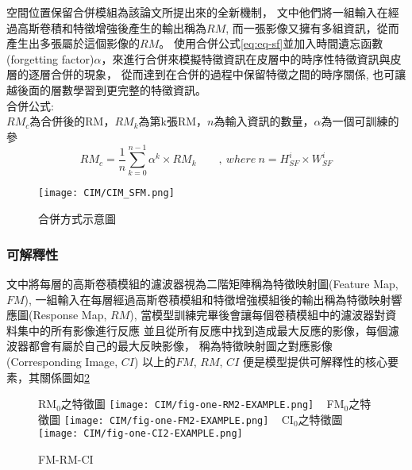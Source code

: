 \documentclass[class=NCU_thesis, crop=false]{standalone}
\begin{document}
空間位置保留合併模組為該論文所提出來的全新機制，
文中他們將一組輸入在經過高斯卷積和特徵增強後產生的輸出稱為$RM$,
而一張影像又擁有多組資訊，從而產生出多張屬於這個影像的$RM$。
使用合併公式\cref{eq:eq-sf}並加入時間遺忘函數(forgetting factor)$\alpha$，來進行合併來模擬特徵資訊在皮層中的時序性特徵資訊與皮層的逐層合併的現象，
從而達到在合併的過程中保留特徵之間的時序關係,
也可讓越後面的層數學習到更完整的特徵資訊。\\
合併公式:\\
$RM_{c}$為合併後的RM，$RM_{k}$為第k張RM，$n$為輸入資訊的數量，$\alpha$為一個可訓練的參
\begin{equation}
    \label{eq:eq-sf}
    RM_{c}=\frac{1}{n} \sum_{k = 0}^{n-1} \alpha^{k} \times RM_{k}  \qquad ,\ where\ n = \textit{H}^{i}_{SF} \times \textit{W}^{i}_{SF}
\end{equation}

\begin{figure}[H]
  \centering
  \texttt{[image: CIM/CIM\_SFM.png]}
  \caption{合併方式示意圖~\cite{YangCNNInterpretable}}
  \label{fig:CIM_SFM}
\end{figure}


\subsubsection{可解釋性}
文中將每層的高斯卷積模組的濾波器視為二階矩陣稱為特徵映射圖(Feature Map, $FM$),
一組輸入在每層經過高斯卷積模組和特徵增強模組後的輸出稱為特徵映射響應圖(Response Map, $RM$),
當模型訓練完畢後會讓每個卷積模組中的濾波器對資料集中的所有影像進行反應
並且從所有反應中找到造成最大反應的影像，每個濾波器都會有屬於自己的最大反映影像，
稱為特徵映射圖之對應影像(Corresponding Image, $CI$)
以上的$FM$, $RM$, $CI$ 便是模型提供可解釋性的核心要素，其關係圖如\cref{fig:one-FM2-RM2-CI2-EXAMPLE}

\begin{figure}[H]
    \centering
    \subcaptionbox
        {RM$_{0}$之特徵圖
        \label{fig:one-RM2-EXAMPLE}}
        {\texttt{[image: CIM/fig-one-RM2-EXAMPLE.png]}}
    ~
    \subcaptionbox
        {FM$_{0}$之特徵圖
        \label{fig:one-FM2-EXAMPLE}}
        {\texttt{[image: CIM/fig-one-FM2-EXAMPLE.png]}}
    ~
    \subcaptionbox
        {CI$_{0}$之特徵圖
        \label{fig:one-CI2-EXAMPLE}}
        {\texttt{[image: CIM/fig-one-CI2-EXAMPLE.png]}}
    \caption{FM-RM-CI\cite{YangCNNInterpretable}}
    \label{fig:one-FM2-RM2-CI2-EXAMPLE}
\end{figure}
\end{document}
